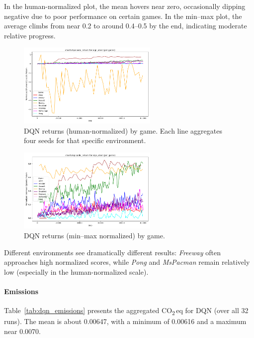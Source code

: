 In the human-normalized plot, the mean hovers near zero, 
occasionally dipping negative due to poor performance on certain games. 
In the min--max plot, the average climbs from near 0.2 to around 0.4--0.5 by the end, 
indicating moderate relative progress.

\begin{figure}
	\centering
	\includegraphics[width=0.6\textwidth]{figures/dqn/charts_episodic_return_per_game_human_dqn_atari.png}
	\caption{DQN returns (human-normalized) by game. Each line aggregates 
		four seeds for that specific environment.}
	\label{fig:dqn_return_pergame_human}
\end{figure}

\begin{figure}
	\centering
	\includegraphics[width=0.6\textwidth]{figures/dqn/charts_episodic_return_per_game_minmax_dqn_atari.png}
	\caption{DQN returns (min--max normalized) by game.}
	\label{fig:dqn_return_pergame_minmax}
\end{figure}

Different environments see dramatically different results: 
\emph{Freeway} often approaches high normalized scores, while 
\emph{Pong} and \emph{MsPacman} remain relatively low 
(especially in the human-normalized scale).

\paragraph{Emissions}
Table~\ref{tab:dqn_emissions} presents the aggregated CO\textsubscript{2}\,eq for DQN 
(over all 32 runs). The mean is about \num{0.00647}, 
with a minimum of \num{0.00616} and a maximum near \num{0.0070}.

